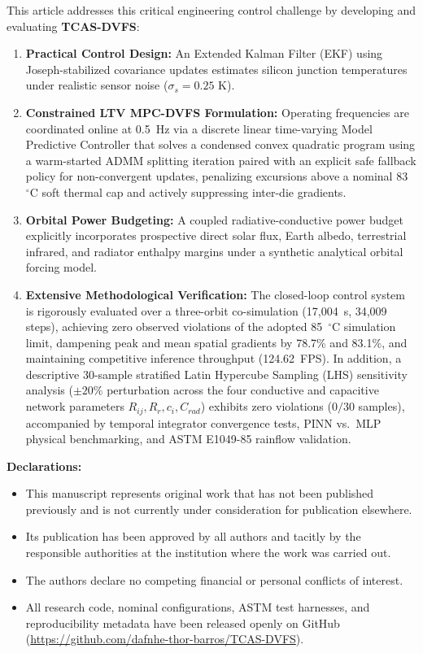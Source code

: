\documentclass[11pt,a4paper]{article}
\begin{document}
This article addresses this critical engineering control challenge by developing and evaluating \textbf{TCAS-DVFS}:
\begin{enumerate}
    \item \textbf{Practical Control Design:} An Extended Kalman Filter (EKF) using Joseph-stabilized covariance updates estimates silicon junction temperatures under realistic sensor noise ($\sigma_s = 0.25\text{ K}$).
    \item \textbf{Constrained LTV MPC-DVFS Formulation:} Operating frequencies are coordinated online at 0.5~Hz via a discrete linear time-varying Model Predictive Controller that solves a condensed convex quadratic program using a warm-started ADMM splitting iteration paired with an explicit safe fallback policy for non-convergent updates, penalizing excursions above a nominal 83~$^\circ$C soft thermal cap and actively suppressing inter-die gradients.
    \item \textbf{Orbital Power Budgeting:} A coupled radiative-conductive power budget explicitly incorporates prospective direct solar flux, Earth albedo, terrestrial infrared, and radiator enthalpy margins under a synthetic analytical orbital forcing model.
    \item \textbf{Extensive Methodological Verification:} The closed-loop control system is rigorously evaluated over a three-orbit co-simulation (17,004~s, 34,009 steps), achieving zero observed violations of the adopted 85~$^\circ$C simulation limit, dampening peak and mean spatial gradients by 78.7\% and 83.1\%, and maintaining competitive inference throughput (124.62~FPS). In addition, a descriptive 30-sample stratified Latin Hypercube Sampling (LHS) sensitivity analysis ($\pm20\%$ perturbation across the four conductive and capacitive network parameters $R_{ij}, R_r, c_i, C_{rad}$) exhibits zero violations ($0/30$ samples), accompanied by temporal integrator convergence tests, PINN vs.\ MLP physical benchmarking, and ASTM E1049-85 rainflow validation.
\end{enumerate}

\textbf{Declarations:}
\begin{itemize}
    \item This manuscript represents original work that has not been published previously and is not currently under consideration for publication elsewhere.
    \item Its publication has been approved by all authors and tacitly by the responsible authorities at the institution where the work was carried out.
    \item The authors declare no competing financial or personal conflicts of interest.
    \item All research code, nominal configurations, ASTM test harnesses, and reproducibility metadata have been released openly on GitHub (\url{https://github.com/dafnhe-thor-barros/TCAS-DVFS}).
\end{itemize}
\end{document}
